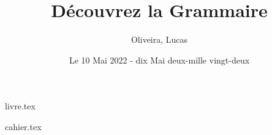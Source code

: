 \documentclass{article}
\title{Découvrez la Grammaire}
\author{Oliveira, Lucas}
\date{Le 10 Mai 2022 - dix Mai deux-mille vingt-deux}
\begin{document}
    \maketitle
    \tableofcontents
    
    \newpage
    {livre.tex}

    {cahier.tex}
\end{document}
